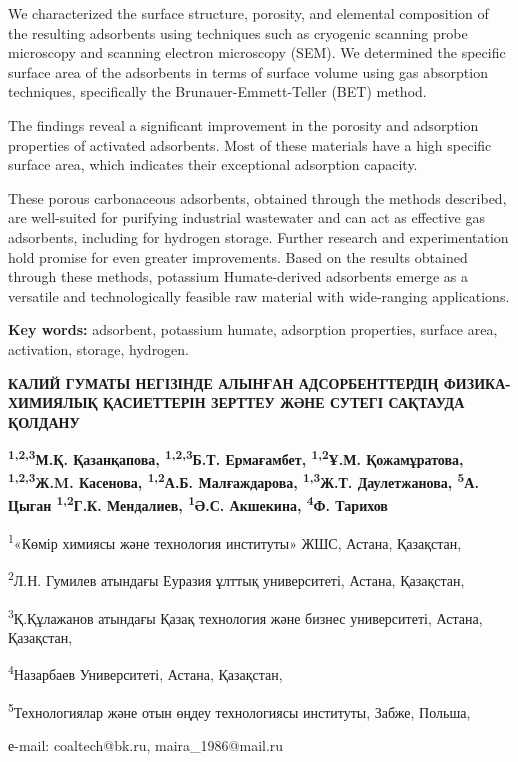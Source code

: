 We characterized the surface structure, porosity, and elemental
composition of the resulting adsorbents using techniques such as
cryogenic scanning probe microscopy and scanning electron microscopy
(SEM). We determined the specific surface area of the adsorbents in
terms of surface volume using gas absorption techniques, specifically
the Brunauer-Emmett-Teller (BET) method.

The findings reveal a significant improvement in the porosity and
adsorption properties of activated adsorbents. Most of these materials
have a high specific surface area, which indicates their exceptional
adsorption capacity.

These porous carbonaceous adsorbents, obtained through the methods
described, are well-suited for purifying industrial wastewater and can
act as effective gas adsorbents, including for hydrogen storage. Further
research and experimentation hold promise for even greater improvements.
Based on the results obtained through these methods, potassium
Humate-derived adsorbents emerge as a versatile and technolog\-ically
feasible raw material with wide-ranging applications.

{\bfseries Key words:} adsorbent, potassium humate, adsorption properties,
surface area, activation, storage, hyd\-rogen.

\begin{articleheader}
{\bfseries КАЛИЙ ГУМАТЫ НЕГІЗІНДЕ АЛЫНҒАН АДСОРБЕНТТЕРДІҢ ФИЗИКА-ХИМИЯЛЫҚ ҚАСИЕТТЕРІН ЗЕРТТЕУ ЖӘНЕ СУТЕГІ САҚТАУДА ҚОЛДАНУ}

{\bfseries
\textsuperscript{1,2,3}М.Қ. Қазанқапова\textsuperscript{\envelope },
\textsuperscript{1,2,3}Б.Т. Ермағамбет,
\textsuperscript{1,2}Ұ.М. Қожамұратова,
\textsuperscript{1,2,3}Ж.M. Касенова,
\textsuperscript{1,2}А.Б. Малғаждарова,
\textsuperscript{1,3}Ж.Т. Даулетжанова,
\textsuperscript{5}А. Цыган
\textsuperscript{1,2}Г.К. Мендалиев,
\textsuperscript{1}Ә.С. Акшекина,
\textsuperscript{4}Ф. Тарихов
}
\end{articleheader}

\begin{affiliation}
\textsuperscript{1}«Көмір химиясы және технология институты» ЖШС, Астана, Қазақстан,

\textsuperscript{2}Л.Н. Гумилев атындағы Еуразия ұлттық университеті, Астана, Қазақстан,

\textsuperscript{3}Қ.Құлажанов атындағы Қазақ технология және бизнес университеті, Астана, Қазақстан,

\textsuperscript{4}Назарбаев Университеті, Астана, Қазақстан,

\textsuperscript{5}Технологиялар және отын өңдеу технологиясы институты, Забже, Польша,

е-mail: coaltech@bk.ru, maira\_1986@mail.ru
\end{affiliation}


